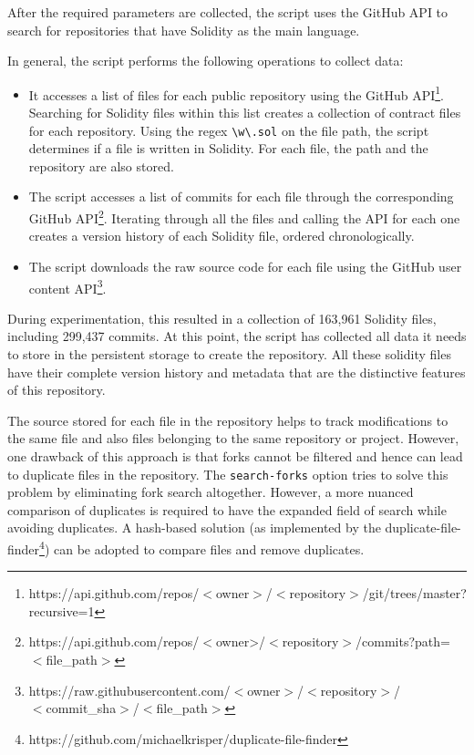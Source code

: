 \documentclass[10pt,conference]{IEEEtran}
\begin{document}
\begin{itemize}
		After the required parameters are collected, the script uses the GitHub API to search for repositories that have Solidity as the main language. 
		
		In general, the script performs the following operations to collect data:
		\begin{itemize}
			\item It accesses a list of files for each public repository using the GitHub API\footnote{https://api.github.com/repos/$<$owner$>$/$<$repository$>$/git/trees/master?\\recursive=1}. Searching for Solidity files within this list creates a collection of contract files for each repository. Using the regex \texttt{\textbackslash w\textbackslash .sol} on the file path, the script determines if a file is written in Solidity. For each file, the path and the repository are also stored.
			\item The script accesses a list of commits for each file through the corresponding GitHub API\footnote{ https://api.github.com/repos/$<$owner>/$<$repository$>$/commits?path=\\$<$file\_path$>$}. Iterating through all the files and calling the API for each one creates a version history of each Solidity file, ordered chronologically.
			\item The script downloads the raw source code for each file using the GitHub user content API\footnote{ https://raw.githubusercontent.com/$<$owner$>$/$<$repository$>$/\\$<$commit\_sha$>$/$<$file\_path$>$}.
		\end{itemize}
		
		During experimentation, this resulted in a collection of 163,961 Solidity files, including 299,437 commits. At this point, the script has collected all data it needs to store in the persistent storage to create the repository. All these solidity files have their complete version history and metadata that are the distinctive features of this repository.
		
		The source stored for each file in the repository helps to track modifications to the same file and also files belonging to the same repository or project. However, one drawback of this approach is that forks cannot be filtered and hence can lead to duplicate files in the repository. The \texttt{search-forks} option tries to solve this problem by eliminating fork search altogether. However, a more nuanced comparison of duplicates is required to have the expanded field of search while avoiding duplicates. A hash-based solution (as implemented by the duplicate-file-finder\footnote{https://github.com/michaelkrisper/duplicate-file-finder}) can be adopted to compare files and remove duplicates. 
		

\end{itemize}
\end{document}
